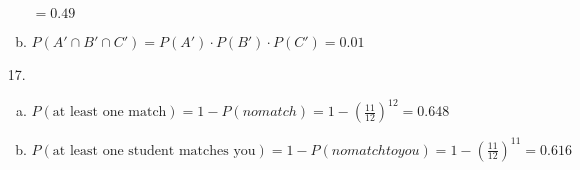 \documentclass{article}\usepackage[]{graphicx}\usepackage[]{color}
\begin{document}
\begin{itemize}
\begin{enumerate}[(a)]
        $=0.49$
        
        \item $P(A' \cap B' \cap C') = P(A')\cdot P(B')\cdot P(C')  = 0.01$

    \end{enumerate}
    
    \item [17.] \begin{enumerate}[(a)]
        \item $P(\mbox{at least one match}) = 1 - P(no match) = 1- (\frac{11}{12})^{12} = 0.648$
        \item $P(\mbox{at least one student matches you}) = 1 - P(no match to you) = 1- (\frac{11}{12})^{11} = 0.616$
    \end{enumerate}
    
\end{itemize}
\end{document}
